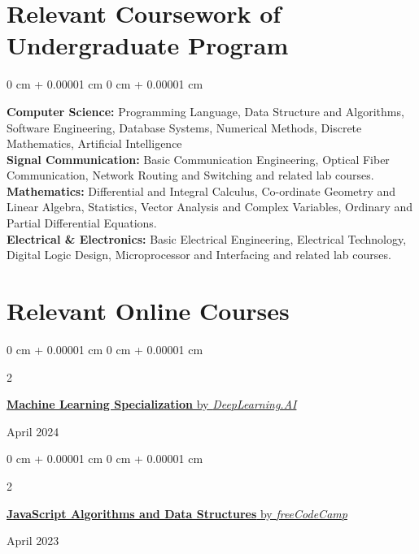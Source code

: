 \documentclass[10pt, letterpaper]{article}
\newenvironment{onecolentry}{
    \begin{adjustwidth}{
        0 cm + 0.00001 cm
    }{
        0 cm + 0.00001 cm
    }
}{
    \end{adjustwidth}
} %
\newenvironment{twocolentry}[2][]{
    \onecolentry
    \def\secondColumn{#2}
    \setcolumnwidth{\fill, 4.5 cm}
    \begin{paracol}{2}
}{
    \switchcolumn \raggedleft \secondColumn
    \end{paracol}
    \endonecolentry
} %
\begin{document}
    \section{Relevant Coursework of Undergraduate Program}
        \begin{onecolentry}
            \textbf{Computer Science:} Programming Language, Data Structure and Algorithms, Software Engineering, Database Systems, Numerical Methods, Discrete Mathematics, Artificial Intelligence\\
            \vspace{0.2 cm}
            \textbf{Signal Communication:} Basic Communication Engineering, Optical Fiber Communication, Network Routing and Switching and related lab courses.\\
            \vspace{0.2 cm}
            \textbf{Mathematics:} Differential and Integral Calculus, Co-ordinate Geometry and Linear Algebra, Statistics, Vector Analysis and Complex Variables, Ordinary and Partial Differential Equations.\\
            \vspace{0.2 cm}
            \textbf{Electrical \& Electronics:} Basic Electrical Engineering, Electrical Technology, Digital Logic Design, Microprocessor and Interfacing and related lab courses.
        \end{onecolentry}

    \section{Relevant Online Courses}

        \begin{twocolentry}
            {April 2024}
            \href{https://www.coursera.org/account/accomplishments/specialization/BA8N9Y8JDSSN}{\textbf{Machine Learning Specialization} by \textit{DeepLearning.AI}}
        \end{twocolentry}

        \vspace{0.1 cm}
        
        \begin{twocolentry}
            {April 2023}
            \href{https://freecodecamp.org/certification/itstheavro/javascript-algorithms-and-data-structures}{\textbf{JavaScript Algorithms and Data Structures} by \textit{freeCodeCamp}}
        \end{twocolentry}

        \vspace{0.1 cm}
        
\end{document}
